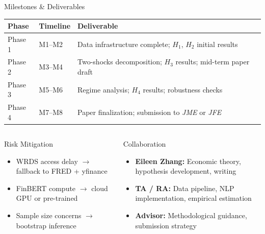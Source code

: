 \documentclass[aspectratio=169, 11pt]{beamer}
\begin{document}
\begin{frame}{Milestones \& Deliverables}
  \centering
  \footnotesize
  \begin{tabularx}{\textwidth}{l l X}
    \toprule
    \textbf{Phase} & \textbf{Timeline} & \textbf{Deliverable} \\
    \midrule
    Phase 1 & M1--M2 & Data infrastructure complete; $H_1$, $H_2$ initial results \\
    Phase 2 & M3--M4 & Two-shocks decomposition; $H_3$ results; mid-term paper draft \\
    Phase 3 & M5--M6 & Regime analysis; $H_4$ results; robustness checks \\
    Phase 4 & M7--M8 & Paper finalization; submission to \textit{JME} or \textit{JFE} \\
    \bottomrule
  \end{tabularx}

  \vspace{0.5em}
  \begin{columns}[T]
    \begin{ablock}{Risk Mitigation}
      \footnotesize
      \begin{itemize}
        \item WRDS access delay $\to$ fallback to FRED + yfinance
        \item FinBERT compute $\to$ cloud GPU or pre-trained
        \item Sample size concerns $\to$ bootstrap inference
      \end{itemize}
    \end{ablock}

    \begin{agreenblock}{Collaboration}
      \footnotesize
      \begin{itemize}
        \item \textbf{Eileen Zhang:} Economic theory, hypothesis development, writing
        \item \textbf{TA / RA:} Data pipeline, NLP implementation, empirical estimation
        \item \textbf{Advisor:} Methodological guidance, submission strategy
      \end{itemize}
    \end{agreenblock}
  \end{columns}
\end{frame}

\end{document}

